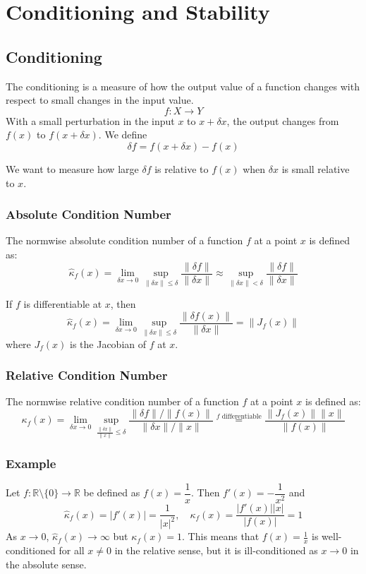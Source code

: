 \documentclass[11pt]{article}
\begin{document}
\section{Conditioning and Stability}
\subsection{Conditioning}
The conditioning is a measure of how the output value of a function changes with respect to small changes in the input value.
\[f : X \to Y\]
With a small perturbation in the input \( x \) to \( x + \delta x \), the output changes from \( f(x) \) to \( f(x + \delta x) \). We define
\[\delta f = f(x + \delta x) - f(x)\]

We want to measure how large \( \delta f \) is relative to \( f(x) \) when \( \delta x \) is small relative to \( x \).
\subsubsection{Absolute Condition Number}
The normwise absolute condition number of a function \( f \) at a point \( x \) is defined as:
\[\hat{\kappa}_f(x) = \lim_{\delta x \to 0} \sup_{\|\delta x\| \leq \delta} \frac{\|\delta f\|}{\|\delta x\|} \approx \sup_{\|\delta x\| < \delta} \frac{\|\delta f\|}{\|\delta x\|}\]

If \( f \) is differentiable at \( x \), then
\[\hat{\kappa}_f(x) = \lim_{\delta x \to 0} \sup_{\|\delta x\| \leq \delta} \frac{\|\delta f(x)\|}{\|\delta x\|} = \|J_f(x)\|\]
where \( J_f(x) \) is the Jacobian of \( f \) at \( x \).

\subsubsection{Relative Condition Number}
The normwise relative condition number of a function \( f \) at a point \( x \) is defined as:
\[\kappa_f(x) = \lim_{\delta x \to 0} \sup_{\frac{\|\delta x\|}{\|x\|} \leq \delta} \frac{\|\delta f\| / \|f(x)\|}{\|\delta x\| / \|x\|} \stackrel{f \text{ differentiable}}{=} \frac{\|J_f(x)\| \|x\|}{\|f(x)\|}\]
\subsubsection*{Example}
Let \( f : \mathbb{R} \setminus \{0\} \to \mathbb{R} \) be defined as \( f(x) = \dfrac{1}{x} \). Then \( f'(x) = -\dfrac{1}{x^2} \) and
\[\hat{\kappa}_f(x) = |f'(x)| = \frac{1}{|x|^2}, \quad \kappa_f(x) = \frac{|f'(x)| |x|}{|f(x)|} = 1\]
As \( x \to 0 \), \( \hat{\kappa}_f(x) \to \infty \) but \( \kappa_f(x) = 1 \). This means that \( f(x) = \frac{1}{x} \) is well-conditioned for all \( x \neq 0 \) in the relative sense, but it is ill-conditioned as \( x \to 0 \) in the absolute sense.
\end{document}
